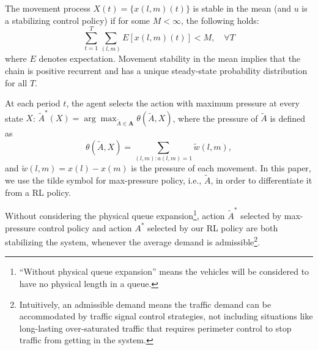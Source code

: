 \begin{definition} 
The movement process $X(t) = \{x(l, m)(t)\}$ is stable in the mean (and $u$ is a stabilizing control policy) if for
some $M<\infty$, the following holds:
\begin{equation}
\label{eq:stability}
    \sum_{t=1}^{T}\sum_{(l,m)}E[x(l,m)(t)]<M,\quad\forall T
\end{equation}
where $E$ denotes expectation. Movement stability in the mean implies that the chain is positive recurrent and has a unique steady-state probability distribution for all $T$. 
\end{definition}


\begin{definition} 
\label{def:maxpressure}
At each period $t$, the agent selects the action with maximum pressure at every state $X$: $
\tilde{A}^*(X) = \arg\max_{\tilde{A}\in \pmb{A}}\theta(\tilde{A}, X)$, where the pressure of $\tilde{A}$ is defined as
$$\theta(\tilde{A},X) = \sum_{(l,m):a(l,m)=1} \tilde{w}(l,m),$$
and $\tilde{w}(l,m) = x(l)- x(m)$ is the pressure of each movement. 
In this paper, we use the tilde symbol for max-pressure policy, i.e., $\tilde{A}$, in order to differentiate it from a RL policy.
\end{definition}

\begin{theorem}
\label{theo:stable} Without considering the physical queue expansion\footnote{``Without physical queue expansion'' means the vehicles will be considered to have no physical length in a queue.}, action $\tilde{A}^*$ selected by max-pressure control policy and action $A^*$ selected by our RL policy are both stabilizing the system, whenever the average demand is admissible\footnote{Intuitively, an admissible demand means the traffic demand can be accommodated by traffic signal control strategies, not including situations like long-lasting over-saturated traffic that requires perimeter control to stop traffic from getting in the system.}.
\end{theorem}

